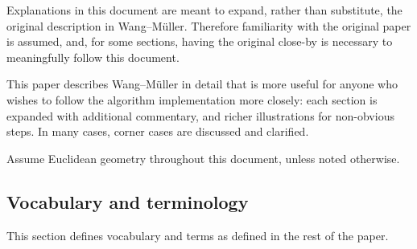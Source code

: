 \documentclass[a4paper]{article}
\newcommand{\WM}{Wang--M{\"u}ller}
\begin{document}
Explanations in this document are meant to expand, rather than substitute, the
original description in {\WM}. Therefore familiarity with the original paper is
assumed, and, for some sections, having the original close-by is necessary to
meaningfully follow this document.

This paper describes {\WM} in detail that is more useful for anyone who wishes
to follow the algorithm implementation more closely: each section is expanded
with additional commentary, and richer illustrations for non-obvious steps. In
many cases, corner cases are discussed and clarified.

Assume Euclidean geometry throughout this document, unless noted otherwise.

\subsection{Vocabulary and terminology}
\label{sec:vocab}

This section defines vocabulary and terms as defined in the rest of the paper.
\end{document}
